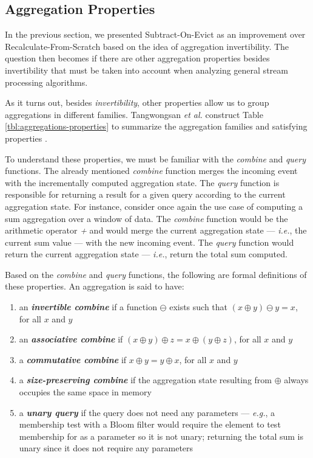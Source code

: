 \subsection{Aggregation Properties}
\label{sec:agg-properties}

In the previous section, we presented Subtract-On-Evict as an improvement over Recalculate-From-Scratch based on the idea of aggregation invertibility. The question then becomes if there are other aggregation properties besides invertibility that must be taken into account when analyzing general stream processing algorithms.

As it turns out, besides \textit{invertibility}, other properties allow us to group aggregations in different families. Tangwongsan \emph{et al.} construct Table \ref{tbl:aggregations-properties} to summarize the aggregation families and satisfying properties \cite{Tangwongsan-Sliding-Window-Aggregation-Algorithms}.

To understand these properties, we must be familiar with the \textit{combine} and \textit{query} functions. The already mentioned \textit{combine} function merges the incoming event with the incrementally computed aggregation state. The \textit{query} function is responsible for returning a result for a given query according to the current aggregation state. For instance, consider once again the use case of computing a sum aggregation over a window of data. The \textit{combine} function would be the arithmetic operator \textit{+} and would merge the current aggregation state --- \textit{i.e.}, the current sum value --- with the new incoming event. The \textit{query} function would return the current aggregation state --- \textit{i.e.}, return the total sum computed.


Based on the \textit{combine} and \textit{query} functions, the following are formal definitions of these properties. An aggregation is said to have:

\begin{enumerate}
    \item  an \textbf{\textit{invertible combine}} if a function $\ominus$ exists such that $(x \oplus y) \ominus y = x$, for all $x$ and $y$
    
    \item  an \textbf{\textit{associative combine}} if $(x \oplus y) \oplus z = x \oplus (y \oplus z)$, for all $x$ and $y$
    
    \item  a \textbf{\textit{commutative combine}} if $x \oplus y = y \oplus x$, for all $x$ and $y$
    
    \item  a \textbf{\textit{size-preserving combine}} if the aggregation state resulting from $\oplus$ always occupies the same space in memory
   
    \item  a \textbf{\textit{unary query}} if the query does not need any parameters --- \textit{e.g.}, a membership test with a Bloom filter would require the element to test membership for as a parameter so it is not unary; returning the total sum is unary since it does not require any parameters
\end{enumerate}

